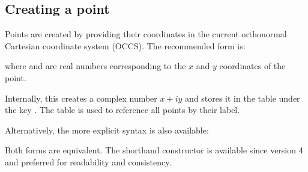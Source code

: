 \subsection{Creating a point}
\label{sub:creating_a_point}

Points are created by providing their coordinates in the current orthonormal Cartesian coordinate system (OCCS). The recommended form is:

\begin{mybox}
\end{mybox}

where  and  are real numbers corresponding to the $x$ and $y$ coordinates of the point.

\medskip

Internally, this creates a complex number $x + i y$ and stores it in the table  under the key . The table  is used to reference all points by their label.

\medskip

Alternatively, the more explicit syntax is also available:

\begin{center}
\end{center}


Both forms are equivalent. The shorthand constructor is available since version 4 and preferred for readability and consistency.


